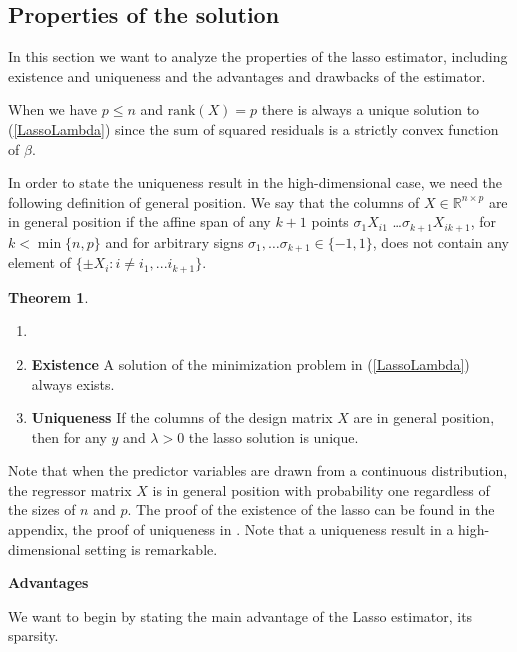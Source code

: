 \documentclass{article}
\theoremstyle{definition}
\newtheorem{theorem}{Theorem}
\begin{document}
\subsection{Properties of the solution}

In this section we want to analyze the properties of the lasso estimator, including existence and uniqueness and the advantages and drawbacks of the estimator. 

When we have $p \leq n$ and $\text{rank}(X) = p$ there is always a unique solution to (\ref{LassoLambda}) since the sum of squared residuals is a strictly convex function of $\beta$.

In order to state the uniqueness result in the high-dimensional case, we need the following definition of general position. We say that the columns of $X \in \mathbb{R}^{n\times p}$ are in general position if the affine span of any $k+1$ points $\sigma_1X_{i1}$ \ldots $\sigma_{k+1}X_{ik+1}$, for $k < \min \{n,p\}$ and for arbitrary signs $\sigma_1, \ldots \sigma_{k+1} \in \{-1,1\}$, does not contain any element of $\{\pm X_i:i\neq i_1, . . . i_{k+1} \}$. 

\begin{theorem}
	\begin{enumerate}
		\item []
		\item \textbf{Existence} A solution of the minimization problem in (\ref{LassoLambda}) always exists.
		\item \textbf{Uniqueness} \citep{tibshirani2013lasso} If the columns of the design matrix $X$ are in general position, then for any $y$ and $\lambda > 0$ the lasso solution is unique.
	\end{enumerate}

\bigskip
Note that when the predictor variables are drawn from a continuous distribution, the regressor matrix $X$ is in general position with probability one regardless of the sizes of $n$ and $p$.
\noindent The proof of the existence of the lasso can be found in the appendix, the proof of uniqueness in \citep{tibshirani2013lasso}. Note that a uniqueness result in a high-dimensional setting is remarkable. 
	
\end{theorem}

\noindent\textbf{Advantages}\newline

\noindent We want to begin by stating the main advantage of the Lasso estimator, its sparsity.
\end{document}
